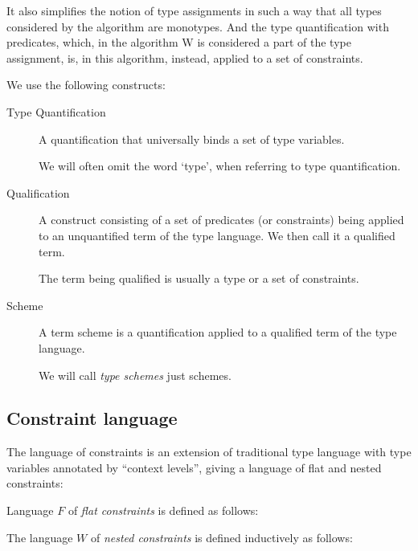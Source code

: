 It also simplifies the notion of type assignments in such a way that all types considered by the algorithm are monotypes. And the type quantification with predicates, which, in the algorithm W is considered a part of the type assignment, is, in this algorithm, instead, applied to a set of constraints.

We use the following constructs:


\begin{description}
    \item[Type Quantification] A quantification that universally binds a set of type variables.

    We will often omit the word `type', when referring to type quantification.

    \item[Qualification] A construct consisting of a set of predicates (or constraints) being applied to an unquantified term of the type language. We then call it a qualified term.

    The term being qualified is usually a type or a set of constraints.

    \item[Scheme] A term scheme is a quantification applied to a qualified term of the type language.

    We will call \emph{type schemes} just schemes.
\end{description}

\subsection{Constraint language}

The language of constraints is an extension of traditional type language with type variables annotated by ``context levels'', giving a language of flat and nested constraints:

\begin{defn}
    \label{def:defer_constr}

    Language $F$ of \emph{flat constraints} is defined as follows:

    \begin{center}\begin{grammar}
    \end{grammar}\end{center}

    The language $W$ of \emph{nested constraints} is defined inductively as follows:

    \begin{center}\begin{grammar}
    \end{grammar}\end{center}

    \label{constraint_language}
\end{defn}

